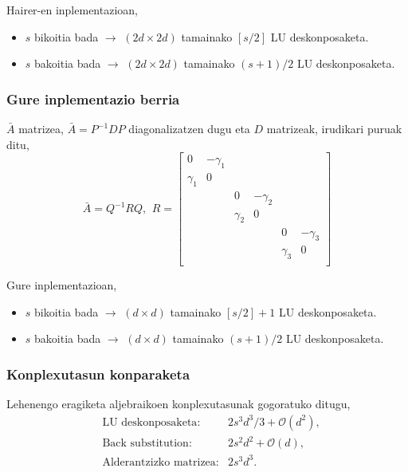 Hairer-en inplementazioan,
\begin{itemize}
\item $s$ bikoitia bada $\rightarrow$ $(2d \times 2d)$ tamainako $[s/2]$  LU deskonposaketa.
\item $s$ bakoitia bada $\rightarrow$ $(2d \times 2d)$ tamainako $(s+1)/2$  LU deskonposaketa.
\end{itemize}

\subsubsection*{Gure inplementazio berria}

$\bar{A}$ matrizea, $\bar{A}=P^{-1}DP$ diagonalizatzen dugu eta $D$ matrizeak, irudikari puruak ditu,
\begin{equation*}
\bar{A}=Q^{-1}RQ, \ \,
R=\begin{bmatrix}
0           & -\gamma_{1}   &            &               &             &           \\
 \gamma_{1} & 0             &            &               &             &           \\
            &               & 0           & -\gamma_{2}  &             &           \\
            &               & \gamma_{2}  & 0              &           &           \\
            &               &             &                & 0            & -\gamma_{3} \\
            &               &             &                & \gamma_{3}   & 0            \\
\end{bmatrix}
\end{equation*}

Gure inplementazioan,
\begin{itemize}
\item $s$ bikoitia bada $\rightarrow$ $(d \times d)$ tamainako $[s/2]+1$  LU deskonposaketa.
\item $s$ bakoitia bada $\rightarrow$ $(d \times d)$ tamainako $(s+1)/2$  LU deskonposaketa.
\end{itemize}

\subsubsection*{Konplexutasun konparaketa}

Lehenengo eragiketa aljebraikoen konplexutasunak gogoratuko ditugu,
\begin{align*}
&\text{LU deskonposaketa}:  &2s^3d^3/3+\mathcal{O}(d^2), \\
&\text{Back substitution}:  &2s^2d^2+\mathcal{O}(d), \\
&\text{Alderantzizko matrizea}: &2s^3d^3.
\end{align*}

